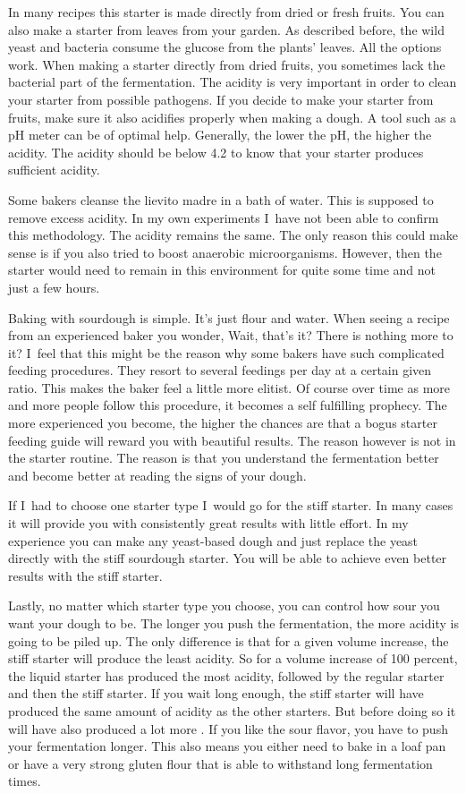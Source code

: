 In many recipes this starter is made directly
from dried or fresh fruits. You can also make a starter from leaves from your
garden. As described before, the wild yeast and bacteria consume the glucose
from the plants' leaves. All the options work. When making a starter directly
from dried fruits, you sometimes lack the bacterial part of the fermentation.
The acidity is very important in order to clean your starter from possible
pathogens. If you decide to make your starter from fruits, make sure it also
acidifies properly when making a dough. A tool such as a pH meter can be of
optimal help. Generally, the lower the pH, the higher the acidity. The acidity
should be below 4.2 to know that your starter produces sufficient acidity.

Some bakers cleanse the lievito madre in a bath of water. This is supposed to
remove excess acidity. In my own experiments I~have not been able to confirm
this methodology. The acidity remains the same. The only reason this could
make sense is if you also tried to boost anaerobic microorganisms. However, then the
starter would need to remain in this environment for quite some time and not just
a few hours.

Baking with sourdough is simple. It's just flour and water. When seeing a recipe
from an experienced baker you wonder, Wait, that's it? There is nothing more
to it? I~feel that this might be the reason why some bakers have such complicated
feeding procedures. They resort to several feedings per day at a certain given ratio.
This makes the baker feel a little more elitist. Of course over time as
more and more people follow this procedure, it becomes a self fulfilling prophecy.
The more experienced you become, the higher the chances are that a bogus starter
feeding guide will reward you with beautiful results. The reason however is
not in the starter routine. The reason is that you understand the fermentation better
and become better at reading the signs of your dough.

If I~had to choose one starter type I~would go for the stiff starter. In many cases
it will provide you with consistently great results with little effort.
In my experience you can make any yeast-based dough and just replace
the yeast directly with the stiff sourdough starter. You will be able
to achieve even better results with the stiff starter.

Lastly, no matter which starter type you choose, you can control how sour
you want your dough to be. The longer you push the fermentation, the more
acidity is going to be piled up. The only difference is that for a given
volume increase, the stiff starter will produce the least acidity. So for a
volume increase of 100 percent, the liquid starter has produced the most acidity,
followed by the regular starter and then the stiff starter. If you wait long
enough, the stiff starter will have produced the same amount of acidity as the
other starters. But before doing so it will have also produced a lot more . If
you like the sour flavor, you have to push your fermentation longer. This also
means you either need to bake in a loaf pan or have a very strong gluten flour
that is able to withstand long fermentation times.
